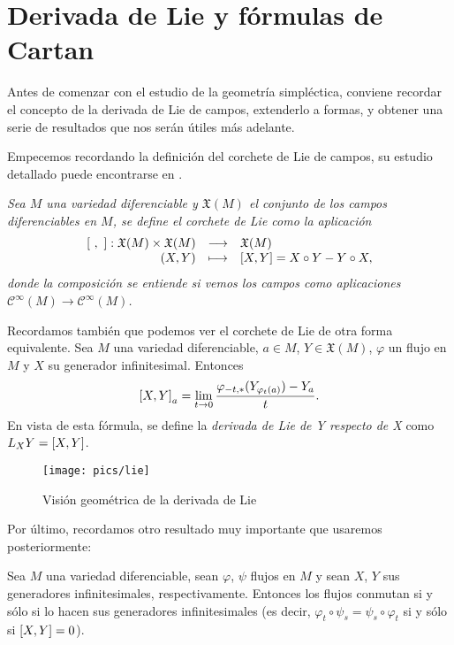 \section{Derivada de Lie y fórmulas de Cartan}\label{sec:lie}

Antes de comenzar con el estudio de la geometría simpléctica, conviene recordar el concepto de la derivada de Lie de campos, extenderlo a formas, y obtener una serie de resultados que nos serán útiles más adelante.

Empecemos recordando la definición del corchete de Lie de campos, su estudio detallado puede encontrarse en \cite{variedades}.

\begin{defn}
  \em
  Sea $M$ una variedad diferenciable y $\mathfrak{X}(M)$ el conjunto de los campos diferenciables en $M$, se define el \emph{corchete de Lie} como la aplicación
  \begin{equation*}
    \begin{array}{rcl}
    \left[\ ,\ \right]: \mathfrak{X}(M) \times \mathfrak{X}(M) & \longrightarrow & \mathfrak{X}(M) \\
    (X,Y) & \longmapsto & \left[X,Y\right] = X \circ Y - Y \circ X,
  \end{array}
  \end{equation*}
  donde la composición se entiende si vemos los campos como aplicaciones $\mathscr{C}^{\infty}(M) \rightarrow \mathscr{C}^{\infty}(M)$.
\end{defn}
Recordamos también que podemos ver el corchete de Lie de otra forma equivalente. Sea $M$ una variedad diferenciable, $a \in M$, $Y \in \mathfrak{X}(M)$, $\varphi$ un flujo en $M$ y $X$ su generador infinitesimal. Entonces
\begin{equation*}
  \left[X,Y\right]_a= \lim_{t\rightarrow 0}\frac{\varphi_{-t,*}(Y_{\varphi_t(a)})-Y_a}{t}.
\end{equation*}
En vista de esta fórmula, se define la \emph{derivada de Lie de Y respecto de X} como $L_XY=\left[X,Y\right]$. 
\begin{figure}[h]
  \centering
  \texttt{[image: pics/lie]}
  \caption{\small Visión geométrica de la derivada de Lie}
  \label{fig:lie}
\end{figure}
Por último, recordamos otro resultado muy importante que usaremos posteriormente:
\begin{prop}
  Sea $M$ una variedad diferenciable, sean $\varphi$, $\psi$ flujos en $M$ y sean $X$, $Y$ sus generadores infinitesimales, respectivamente. Entonces los flujos conmutan si y sólo si lo hacen sus generadores infinitesimales (es decir, $\varphi_t \circ \psi_s = \psi_s \circ \varphi_t$ si y sólo si $\left[X,Y\right]=0$).
\end{prop} 

